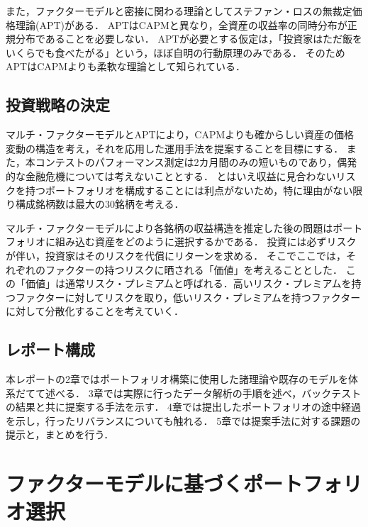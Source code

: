 ﻿\documentclass[11pt]{jreport}
\begin{document}
また，ファクターモデルと密接に関わる理論としてステファン・ロスの無裁定価格理論(APT)\cite{Ross}がある．
APTはCAPMと異なり，全資産の収益率の同時分布が正規分布であることを必要しない．
APTが必要とする仮定は，「投資家はただ飯をいくらでも食べたがる」という，ほぼ自明の行動原理のみである\cite{analyst}．
そのためAPTはCAPMよりも柔軟な理論として知られている．

\section{投資戦略の決定}

マルチ・ファクターモデルとAPTにより，CAPMよりも確からしい資産の価格変動の構造を考え，それを応用した運用手法を提案することを目標にする．
また，本コンテストのパフォーマンス測定は2カ月間のみの短いものであり，偶発的な金融危機については考えないこととする．
とはいえ収益に見合わないリスクを持つポートフォリオを構成することには利点がないため，特に理由がない限り構成銘柄数は最大の30銘柄を考える．

マルチ・ファクターモデルにより各銘柄の収益構造を推定した後の問題はポートフォリオに組み込む資産をどのように選択するかである．
投資には必ずリスクが伴い，投資家はそのリスクを代償にリターンを求める．
そこでここでは，それぞれのファクターの持つリスクに晒される「価値」を考えることとした．
この「価値」は通常リスク・プレミアムと呼ばれる．高いリスク・プレミアムを持つファクターに対してリスクを取り，低いリスク・プレミアムを持つファクターに対して分散化することを考えていく．

\section{レポート構成}
本レポートの2章ではポートフォリオ構築に使用した諸理論や既存のモデルを体系だてて述べる．
3章では実際に行ったデータ解析の手順を述べ，バックテストの結果と共に提案する手法を示す．
4章では提出したポートフォリオの途中経過を示し，行ったリバランスについても触れる．
5章では提案手法に対する課題の提示と，まとめを行う．










\chapter{ファクターモデルに基づくポートフォリオ選択}
\end{document}
